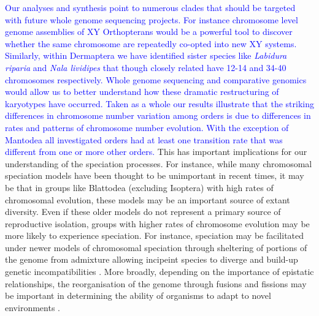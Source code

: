 \documentclass[]{rsos}%
\begin{document}
\textcolor{blue}{Our analyses and synthesis point to numerous clades that should be targeted with future whole genome sequencing projects. 
For instance chromosome level genome assemblies of XY Orthopterans would be a powerful tool to discover whether the same chromosome are repeatedly co-opted into new XY systems.
Similarly, within Dermaptera we have identified sister species like \textit{Labidura riparia} and \textit{Nala lividipes} that though closely related have 12-14 and 34-40 chromosomes respectively. 
Whole genome sequencing and comparative genomics would allow us to better understand how these dramatic restructuring of karyotypes have occurred.
Taken as a whole our results illustrate that the striking differences in chromosome number variation among orders is due to differences in rates and patterns of chromosome number evolution.
With the exception of Mantodea all investigated orders had at least one transition rate that was different from one or more other orders.} 
This has important implications for our understanding of the speciation processes.
For instance, while many chromosomal speciation models \cite{baker1986, white} have been thought to be unimportant in recent times, it may be that in groups like Blattodea (excluding Isoptera) with high rates of chromosomal evolution, these models may be an important source of extant diversity.
Even if these older models do not represent a primary source of reproductive isolation, groups with higher rates of chromosome evolution may be more likely to experience speciation.
For instance, speciation may be facilitated under newer models of chromosomal speciation through sheltering of portions of the genome from admixture allowing incipeint species to diverge and build-up genetic incompatibilities \cite{rieseberg2001}.
More broadly, depending on the importance of epistatic relationships, the reorganisation of the genome through fusions and fissions may be important in determining the ability of organisms to adapt to novel environments \cite{stebbins1971}.
\newpage
\end{document}
